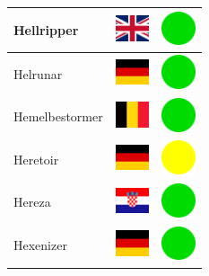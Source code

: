 \documentclass[12pt, a4paper, twoside]{report}
\begin{document}
\begin{center}
\begin{longtable}{|p{5cm}|p{2cm}|p{2cm}|}
 Hellripper                                                 & \includegraphics[width=1cm]{../4x3/gb} &   \includegraphics[width=1cm]{../likes/y} \\ \hline
 Helrunar                                                   & \includegraphics[width=1cm]{../4x3/de} &   \includegraphics[width=1cm]{../likes/y} \\ \hline
 Hemelbestormer                                             & \includegraphics[width=1cm]{../4x3/be} &   \includegraphics[width=1cm]{../likes/y} \\ \hline
 Heretoir                                                   & \includegraphics[width=1cm]{../4x3/de} &   \includegraphics[width=1cm]{../likes/m} \\ \hline
 Hereza                                                     & \includegraphics[width=1cm]{../4x3/hr} &   \includegraphics[width=1cm]{../likes/y} \\ \hline
 Hexenizer                                                  & \includegraphics[width=1cm]{../4x3/de} &   \includegraphics[width=1cm]{../likes/y} \\ \hline

\end{longtable}
\end{center}
\end{document}
